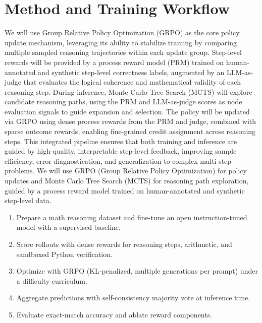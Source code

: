 \documentclass[11pt]{article}
\begin{document}
\section{Method and Training Workflow}
We will use Group Relative Policy Optimization (GRPO) as the core policy update mechanism, leveraging its ability to stabilize training by comparing multiple sampled reasoning trajectories within each update group. Step-level rewards will be provided by a process reward model (PRM) trained on human-annotated and synthetic step-level correctness labels, augmented by an LLM-as-judge that evaluates the logical coherence and mathematical validity of each reasoning step. During inference, Monte Carlo Tree Search (MCTS) will explore candidate reasoning paths, using the PRM and LLM-as-judge scores as node evaluation signals to guide expansion and selection. The policy will be updated via GRPO using dense process rewards from the PRM and judge, combined with sparse outcome rewards, enabling fine-grained credit assignment across reasoning steps. This integrated pipeline ensures that both training and inference are guided by high-quality, interpretable step-level feedback, improving sample efficiency, error diagnostication, and generalization to complex multi-step problems. We will use GRPO (Group Relative Policy Optimization) for policy updates and Monte Carlo Tree Search (MCTS) for reasoning path exploration, guided by a process reward model trained on human-annotated and synthetic step-level data.

\begin{enumerate}
\item Prepare a math reasoning dataset and fine-tune an open instruction-tuned model with a supervised baseline.
\item Score rollouts with dense rewards for reasoning steps, arithmetic, and sandboxed Python verification.
\item Optimize with GRPO (KL-penalized, multiple generations per prompt) under a difficulty curriculum.
\item Aggregate predictions with self-consistency majority vote at inference time.
\item Evaluate exact-match accuracy and ablate reward components.
\end{enumerate}
\end{document}

